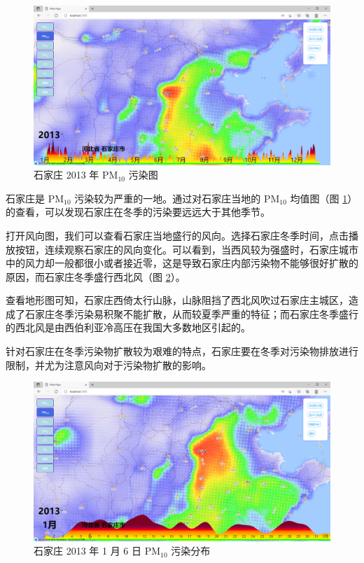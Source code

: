\documentclass[UTF8]{ctexrep}
\begin{document}
    \begin{figure}[h!]
        \centering
        \includegraphics[width=15cm,keepaspectratio]{images/shijiazhuang_2013PM10.png}
        \caption{石家庄 2013 年 $\mathrm{PM}_{10}$ 污染图}
        \label{fig:shijiazhuang_2013PM10}
    \end{figure}
    石家庄是 $\mathrm{PM}_{10}$ 污染较为严重的一地。通过对石家庄当地的 $\mathrm{PM}_{10}$ 均值图（图 \ref{fig:shijiazhuang_2013PM10}）的查看，可以发现石家庄在冬季的污染要远远大于其他季节。
    \par
    打开风向图，我们可以查看石家庄当地盛行的风向。选择石家庄冬季时间，点击播放按钮，连续观察石家庄的风向变化。可以看到，当西风较为强盛时，石家庄城市中的风力却一般都很小或者接近零，这是导致石家庄内部污染物不能够很好扩散的原因，而石家庄冬季盛行西北风（图 \ref{fig:shijiazhuang_wind1}）。
	\par    
    查看地形图可知，石家庄西倚太行山脉，山脉阻挡了西北风吹过石家庄主城区，造成了石家庄冬季污染易积聚不能扩散，从而较夏季严重的特征；而石家庄冬季盛行的西北风是由西伯利亚冷高压在我国大多数地区引起的。
    \par 
    针对石家庄在冬季污染物扩散较为艰难的特点，石家庄要在冬季对污染物排放进行限制，并尤为注意风向对于污染物扩散的影响。
    \begin{figure}[h!]
        \centering
        \includegraphics[width=15cm,keepaspectratio]{images/shijiazhuang_wind1.png}
        \caption{石家庄 2013 年 1 月 6 日 $\mathrm{PM}_{10}$ 污染分布}
        \label{fig:shijiazhuang_wind1}
    \end{figure}
    
\end{document}
